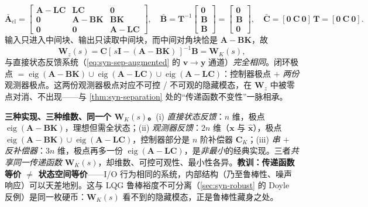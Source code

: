 \begin{equation}
  \bar{\mathbf A}_{\mathrm{cl}}=\begin{bmatrix}\mathbf A-\mathbf L\mathbf C & \mathbf L\mathbf C & \mathbf 0\\ \mathbf 0 & \mathbf A-\mathbf B\mathbf K & \mathbf B\mathbf K\\ \mathbf 0 & \mathbf 0 & \mathbf A-\mathbf L\mathbf C\end{bmatrix},\quad
  \bar{\mathbf B}=\mathbf T^{-1}\begin{bmatrix}\mathbf 0\\\mathbf B\\\mathbf B\end{bmatrix}=\begin{bmatrix}\mathbf 0\\\mathbf B\\\mathbf 0\end{bmatrix},\quad
  \bar{\mathbf C}=[\mathbf 0\ \mathbf C\ \mathbf 0]\,\mathbf T=[\mathbf 0\ \mathbf C\ \mathbf 0].
  \label{eq:syn-comp-tri}
\end{equation}
输入只进入中间块、输出只读取中间块，而中间对角块恰是 $\mathbf A-\mathbf B\mathbf K$，故
\begin{equation}
  \mathbf W_z(s)=\mathbf C[\,s\mathbf I-(\mathbf A-\mathbf B\mathbf K)\,]^{-1}\mathbf B=\mathbf W_K(s),
  \label{eq:syn-comp-WK}
\end{equation}
与直接状态反馈系统（\cref{eq:syn-sep-augmented} 的 $\mathbf v\!\to\!\mathbf y$ 通道）\emph{完全相同}。闭环极点 $=\operatorname{eig}(\mathbf A-\mathbf B\mathbf K)\cup\operatorname{eig}(\mathbf A-\mathbf L\mathbf C)\cup\operatorname{eig}(\mathbf A-\mathbf L\mathbf C)$：控制器极点 $+$ \emph{两份}观测器极点。这两份观测器极点对应不可控 / 不可观的隐藏模态，在 $\mathbf W_z$ 中被零点对消、不出现——与 \cref{thm:syn-separation} 处的“传递函数不变性”一脉相承。

\begin{insight}
\textbf{三种实现、三种维数、同一个 $\mathbf W_K(s)$。}\;(i) \emph{直接状态反馈}：$n$ 维，极点 $\operatorname{eig}(\mathbf A-\mathbf B\mathbf K)$，理想但需全状态；(ii) \emph{观测器反馈}：$2n$ 维（$\mathbf x$ 与 $\hat{\mathbf x}$），极点 $\operatorname{eig}(\mathbf A-\mathbf B\mathbf K)\cup\operatorname{eig}(\mathbf A-\mathbf L\mathbf C)$，控制器部分是 $n$ 阶补偿器 $\mathbf C_K$；(iii) \emph{串 $+$ 反补偿器}：$3n$ 维，极点再多一份 $\operatorname{eig}(\mathbf A-\mathbf L\mathbf C)$，是\emph{非最小}的经典实现。三者\emph{共享同一传递函数} $\mathbf W_K(s)$，却维数、可控可观性、最小性各异。\textbf{教训：传递函数等价 $\neq$ 状态空间等价}——I/O 行为相同的系统，内部结构（乃至鲁棒性、噪声响应）可以天差地别。这与 LQG 鲁棒裕度不可分离（\cref{sec:syn-robust} 的 Doyle 反例）是同一枚硬币：$\mathbf W_K(s)$ 看不到的隐藏模态，正是鲁棒性藏身之处。
\end{insight}

